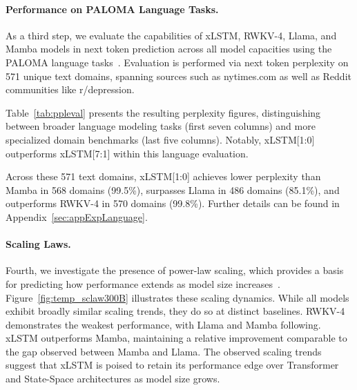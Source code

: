 \paragraph{Performance on PALOMA Language Tasks.} As a third step, we evaluate the capabilities of xLSTM, RWKV-4, Llama, and Mamba models in next token prediction across all model capacities using the PALOMA language tasks~\citep{Magnusson:23arxivshort}. Evaluation is performed via next token perplexity on 571 unique text domains, spanning sources such as nytimes.com as well as Reddit communities like r/depression.

Table~\ref{tab:ppleval} presents the resulting perplexity figures, distinguishing between broader language modeling tasks (first seven columns) and more specialized domain benchmarks (last five columns). Notably, xLSTM[1:0] outperforms xLSTM[7:1] within this language evaluation.

Across these 571 text domains, xLSTM[1:0] achieves lower perplexity than Mamba in 568 domains (99.5\%), surpasses Llama in 486 domains (85.1\%), and outperforms RWKV-4 in 570 domains (99.8\%). Further details can be found in Appendix~\ref{sec:appExpLanguage}.

\paragraph{Scaling Laws.} Fourth, we investigate the presence of power-law scaling, which provides a basis for predicting how performance extends as model size increases~\citep{Kaplan:20,Brown:20short}. Figure~\ref{fig:temp_sclaw300B} illustrates these scaling dynamics. While all models exhibit broadly similar scaling trends, they do so at distinct baselines. RWKV-4 demonstrates the weakest performance, with Llama and Mamba following. xLSTM outperforms Mamba, maintaining a relative improvement comparable to the gap observed between Mamba and Llama. The observed scaling trends suggest that xLSTM is poised to retain its performance edge over Transformer and State-Space architectures as model size grows.

